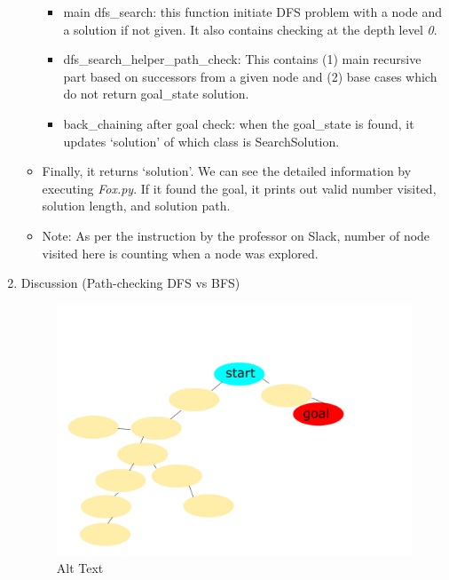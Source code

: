 \documentclass[]{article}
\providecommand{\tightlist}{%
  \setlength{\itemsep}{0pt}\setlength{\parskip}{0pt}}
\begin{document}
\begin{enumerate}
\begin{itemize}
    \begin{itemize}
    \tightlist
    \item
      main dfs\_search: this function initiate DFS problem with a node
      and a solution if not given. It also contains checking at the
      depth level \emph{0}.
    \item
      dfs\_search\_helper\_path\_check: This contains (1) main recursive
      part based on successors from a given node and (2) base cases
      which do not return goal\_state solution.
    \item
      back\_chaining after goal check: when the goal\_state is found, it
      updates `solution' of which class is SearchSolution.
    \end{itemize}
  \item
    Finally, it returns `solution'. We can see the detailed information
    by executing \emph{Fox.py}. If it found the goal, it prints out
    valid number visited, solution length, and solution path.
  \item
    Note: As per the instruction by the professor on Slack, number of
    node visited here is counting when a node was explored.
  \end{itemize}
\item
  Discussion (Path-checking DFS vs BFS)

  \begin{figure}
  \centering
  \includegraphics{images/dfs_vs_bfs.pdf}
  \caption{Alt Text}
  \end{figure}


\end{enumerate}
\end{document}
